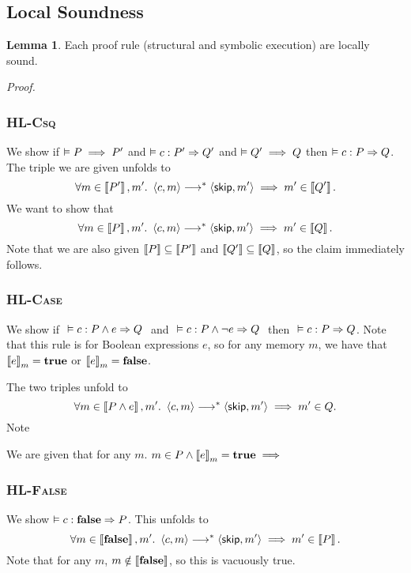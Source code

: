 \documentclass[10pt]{article}
\theoremstyle{definition}
\newtheorem{lemma}{Lemma}
\begin{document}
\subsection*{Local Soundness}


\begin{lemma}
    Each proof rule (structural and symbolic execution) are locally sound.
\end{lemma}

\noindent
\emph{Proof.}

\subsubsection*{\textsc{HL-Csq}}
We show if $\vDash P \implies P'$ and 
      $\VAL \Triple c : P' => Q'$ and 
      $\vDash Q' \implies Q$
then $\VAL \Triple c : P => Q$.
The triple we are given unfolds to
\[
    \forall m \in \Interp{P'}, m'.\
    \Cfg(c, m) \sstepstotrans \Cfg(\Skip, m')
    \implies m' \in \Interp{Q'}.
\]
We want to show that
\[
    \forall m \in \Interp P, m'.\
    \Cfg(c, m) \sstepstotrans \Cfg(\Skip, m')
    \implies m' \in \Interp Q.
\]
Note that we are also given $\left\llbracket P \right\rrbracket \subseteq \left\llbracket P' \right\rrbracket$ and $\left\llbracket Q' \right\rrbracket \subseteq \left\llbracket Q \right\rrbracket$,
so the claim immediately follows.

\subsubsection*{\textsc{HL-Case}}
We show if $\ \VAL \Triple c : P \wedge e => Q\ $ and
      $\ \VAL \Triple c : P \wedge \neg e => Q\ $ then
    $\ \VAL \Triple c : P => Q$.
Note that this rule is for Boolean expressions $e$,
so for any memory $m$, we have that $\Eval(e,m) = \True$
or $\Eval(e,m) = \False$.

The two triples unfold to
\[
    \forall m \in \Interp{P \wedge e}, m'.\
    \Cfg(c, m) \sstepstotrans \Cfg(\Skip, m') 
    \implies m' \in Q.
\]
Note

We are given that for any $m$. $m \in P \wedge \Eval(e,m) = \True \implies $

\subsubsection*{\textsc{HL-False}}
We show $\VAL \Triple c : \EFalse => P$.
This unfolds to
\[
    \forall m \in \Interp{\EFalse}, m'.\
    \Cfg(c, m) \sstepstotrans \Cfg(\Skip, m') 
    \implies m' \in \Interp{P}.
\]
Note that for any $m$, $m \notin \left\llbracket \textbf{false} \right\rrbracket$,
so this is vacuously true.
\end{document}
